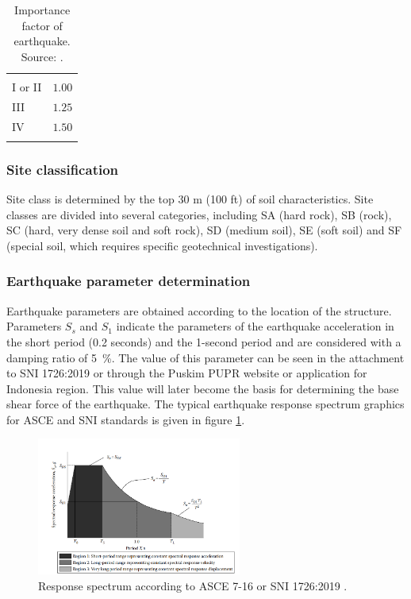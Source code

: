 \documentclass{cup-pan}
\begin{document}
\renewcommand{\arraystretch}{1}
\begin{longtable}{P{2in} P{2in}}
\caption{Importance factor of earthquake. Source: \cite{sni172619}.}\\
\headrow {} &   \\
I or II &$1.00$\\
III & $1.25$\\
IV & $1.50$\\
\label{tab:prioreq}
\end{longtable}

\subsubsection{Site classification}
Site class is determined by the top 30 m (100 ft) of soil characteristics. Site classes are divided into several categories, including SA (hard rock), SB (rock), SC (hard, very dense soil and soft rock), SD (medium soil), SE (soft soil) and SF (special soil, which requires specific geotechnical investigations).

\subsubsection{Earthquake parameter determination}
\label{subsub:eqparam}
Earthquake parameters are obtained according to the location of the structure. Parameters $S_s$ and $S_1$ indicate the parameters of the earthquake acceleration in the short period (0.2 seconds) and the 1-second period and are considered with a damping ratio of \SI{5}{\percent}. The value of this parameter can be seen in the attachment to SNI 1726:2019 or through the Puskim PUPR website or application for Indonesia region. This value will later become the basis for determining the base shear force of the earthquake. The typical earthquake response spectrum graphics for ASCE and SNI standards is given in figure \ref{fig:respspectra}.

\begin{figure}[H]
\centering
\includegraphics[width=0.6\textwidth]{fig2.png}
\caption{Response spectrum according to ASCE 7-16 or SNI 1726:2019 \citep{taranath}.}
\label{fig:respspectra}
\end{figure}
\end{document}
